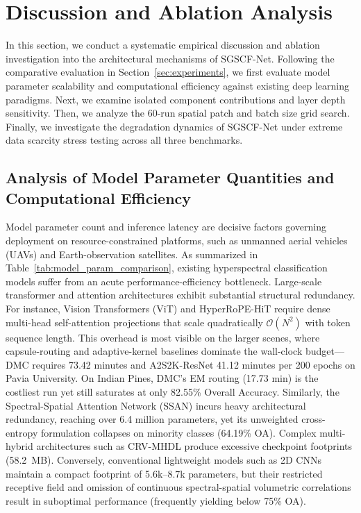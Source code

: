 \documentclass[manuscript,screen,review]{acmart}
\begin{document}
\newpage
\section{Discussion and Ablation Analysis}
\label{sec:discussion}
In this section, we conduct a systematic empirical discussion and ablation investigation into the architectural mechanisms of SGSCF-Net. Following the comparative evaluation in Section~\ref{sec:experiments}, we first evaluate model parameter scalability and computational efficiency against existing deep learning paradigms. Next, we examine isolated component contributions and layer depth sensitivity. Then, we analyze the 60-run spatial patch and batch size grid search. Finally, we investigate the degradation dynamics of SGSCF-Net under extreme data scarcity stress testing across all three benchmarks.

\subsection{Analysis of Model Parameter Quantities and Computational Efficiency}
\label{subsec:param_analysis}
Model parameter count and inference latency are decisive factors governing deployment on resource-constrained platforms, such as unmanned aerial vehicles (UAVs) and Earth-observation satellites. As summarized in Table~\ref{tab:model_param_comparison}, existing hyperspectral classification models suffer from an acute performance-efficiency bottleneck. Large-scale transformer and attention architectures exhibit substantial structural redundancy. For instance, Vision Transformers (ViT) \cite{dosovitskiy2020image} and HyperRoPE-HiT \cite{khan2025hyperrope} require dense multi-head self-attention projections that scale quadratically $\mathcal{O}(N^2)$ with token sequence length. This overhead is most visible on the larger scenes, where capsule-routing and adaptive-kernel baselines dominate the wall-clock budget---DMC requires 73.42 minutes and A2S2K-ResNet 41.12 minutes per 200 epochs on Pavia University. On Indian Pines, DMC's EM routing (17.73 min) is the costliest run yet still saturates at only 82.55\% Overall Accuracy. Similarly, the Spectral-Spatial Attention Network (SSAN) \cite{sun2019spectral} incurs heavy architectural redundancy, reaching over 6.4 million parameters, yet its unweighted cross-entropy formulation collapses on minority classes (64.19\% OA). Complex multi-hybrid architectures such as CRV-MHDL \cite{alalimi2022compression} produce excessive checkpoint footprints (58.2~MB). Conversely, conventional lightweight models such as 2D CNNs maintain a compact footprint of 5.6k--8.7k parameters, but their restricted receptive field and omission of continuous spectral-spatial volumetric correlations result in suboptimal performance (frequently yielding below 75\% OA).
\end{document}
